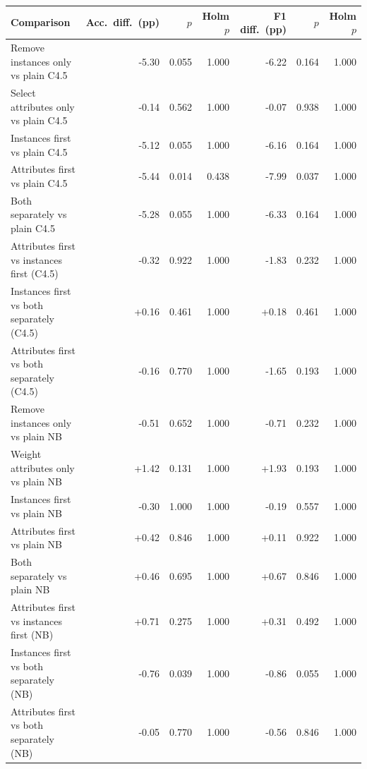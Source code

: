 \begin{tabular}{lrrrrrr}
\toprule
Comparison & Acc.\ diff.\ (pp) & $p$ & Holm $p$ & F1 diff.\ (pp) & $p$ & Holm $p$ \\
\midrule
Remove instances only vs plain C4.5 & -5.30 & 0.055 & 1.000 & -6.22 & 0.164 & 1.000 \\
Select attributes only vs plain C4.5 & -0.14 & 0.562 & 1.000 & -0.07 & 0.938 & 1.000 \\
Instances first vs plain C4.5 & -5.12 & 0.055 & 1.000 & -6.16 & 0.164 & 1.000 \\
Attributes first vs plain C4.5 & -5.44 & 0.014 & 0.438 & -7.99 & 0.037 & 1.000 \\
Both separately vs plain C4.5 & -5.28 & 0.055 & 1.000 & -6.33 & 0.164 & 1.000 \\
Attributes first vs instances first (C4.5) & -0.32 & 0.922 & 1.000 & -1.83 & 0.232 & 1.000 \\
Instances first vs both separately (C4.5) & +0.16 & 0.461 & 1.000 & +0.18 & 0.461 & 1.000 \\
Attributes first vs both separately (C4.5) & -0.16 & 0.770 & 1.000 & -1.65 & 0.193 & 1.000 \\
Remove instances only vs plain NB & -0.51 & 0.652 & 1.000 & -0.71 & 0.232 & 1.000 \\
Weight attributes only vs plain NB & +1.42 & 0.131 & 1.000 & +1.93 & 0.193 & 1.000 \\
Instances first vs plain NB & -0.30 & 1.000 & 1.000 & -0.19 & 0.557 & 1.000 \\
Attributes first vs plain NB & +0.42 & 0.846 & 1.000 & +0.11 & 0.922 & 1.000 \\
Both separately vs plain NB & +0.46 & 0.695 & 1.000 & +0.67 & 0.846 & 1.000 \\
Attributes first vs instances first (NB) & +0.71 & 0.275 & 1.000 & +0.31 & 0.492 & 1.000 \\
Instances first vs both separately (NB) & -0.76 & 0.039 & 1.000 & -0.86 & 0.055 & 1.000 \\
Attributes first vs both separately (NB) & -0.05 & 0.770 & 1.000 & -0.56 & 0.846 & 1.000 \\
\bottomrule
\end{tabular}

